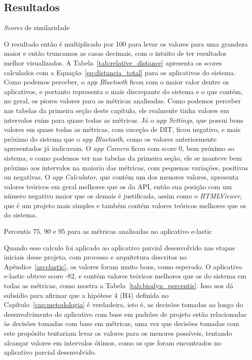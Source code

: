 \subsection{Resultados}

\begin{table}[!htb]
\centering
{}

\caption{\textit{Scores} de similaridade}
\label{tab:relative_distance}
\end{table}

O resultado então é multiplicado por 100 para levar os valores para uma grandeza maior e então truncamos as casas decimais, com o intuito de ter resultados melhor visualizados. A Tabela~\ref{tab:relative_distance} apresenta os scores calculados com a Equação~\ref{eq:distancia_total} para os aplicativos do sistema. Como podemos perceber, o \textit{app} \textit{Bluetooth} ficou com o maior valor dentre os aplicativos, e portanto representa o mais discrepante do sistema e o que contém, no geral, os piores valores para as métricas analisadas. Como podemos perceber nas tabelas da primeira seção deste capítulo, ele realmente tinha valores em intervalos ruins para quase todas as métricas. Já o \textit{app} \textit{Settings}, que possui bons valores em quase todas as métricas, com exceção de DIT, ficou negativo, e mais próximo do sistema que o \textit{app} \textit{Bluetooth}, como os valores anteriormente apresentados já indicavam. O \textit{app} \textit{Camera} ficou com score 0, bem próximo ao sistema, e como podemos ver nas tabelas da primeira seção, ele se manteve bem próximo aos intervalos na maioria das métricas, com pequenas variações, positivas ou negativas. O \textit{app} \textit{Calculator}, que contém um dos menores valores, apresenta valores teóricos em geral melhores que os da API, então sua posição com um número negativo maior que os demais é justificada, assim como o \textit{HTMLViewer}, que é um projeto mais simples e também contém valores teóricos melhores que os do sistema.

\begin{table}[!htb]
\centering
{}

\caption{Percentis 75, 90 e 95 para as métricas analisadas no aplicativo e-lastic}
\label{tab:biodyn_percentis}
\end{table}

Quando esse calculo foi aplicado ao aplicativo parcial desenvolvido nas etapas iniciais desse projeto, com processo e arquitetura descritos no Apêndice~\ref{ap:elastic}, os valores foram muito bons, como esperado. O aplicativo e-lastic obteve score -82, e contém valores teóricos melhores que os do sistema em todas as métricas, como mostra a Tabela~\ref{tab:biodyn_percentis}. Isso nos dá subsídio para afirmar que a hipótese 4 (H4) definida no Capítulo~\ref{cap:metodologia} é verdadeira, isto é, as decisões tomadas ao longo do desenvolvimento do aplicativo com base em padrões de projeto estão relacionadas às decisões tomadas com base em métricas, uma vez que decisões tomadas com este propósito tentariam levar os valores para os menores possíveis, tentando alcançar valores em intervalos ótimos, como os que foram encontrados no aplicativo parcial desenvolvido.

